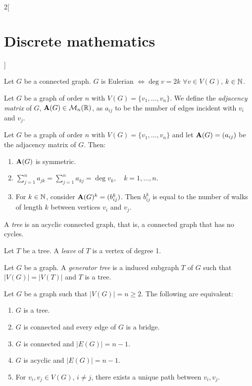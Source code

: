\documentclass[../../../main.tex]{subfiles}
\begin{document}
\begin{multicols}{2}[\section{Discrete mathematics}]
\begin{definition}
  \end{definition}
  \begin{theorem}
    Let $G$ be a connected graph. $G$ is Eulerian $\iff\deg v=2k$ $\forall v\in V(G)$, $k\in\mathbb{N} $.
  \end{theorem}
  \begin{definition}
    Let $G$ be a graph of order $n$ with $V(G)=\{v_1,\ldots,v_n\}$. We define the \emph{adjacency matrix} of $G$, $\boldsymbol{\mathrm{A}}(G)\in\mathcal{M}_n(\mathbb{R} )$, as $a_{ij}$ to be the number of edges incident with $v_i$ and $v_j$.
  \end{definition}
  \begin{prop}
    Let $G$ be a graph of order $n$ with $V(G)=\{v_1,\ldots,v_n\}$ and let $\boldsymbol{\mathrm{A}}(G)=(a_{ij})$ be the adjacency matrix of $G$. Then:
    \begin{enumerate}
      \item $\boldsymbol{\mathrm{A}}(G)$ is symmetric.
      \item $\displaystyle\sum_{j=1}^n a_{jk}=\sum_{j=1}^n a_{kj}=\deg v_k,\quad k=1,\ldots,n$.
      \item For $k\in\mathbb{N} $, consider $\boldsymbol{\mathrm{A}}(G)^k=(b_{ij}^k)$. Then $b_{ij}^k$ is equal to the number of walks of length $k$ between vertices $v_i$ and $v_j$.
    \end{enumerate}
  \end{prop}
  \begin{definition}
    A \emph{tree} is an acyclic connected graph, that is, a connected graph that has no cycles.
  \end{definition}
  \begin{definition}
    Let $T$ be a tree. A \emph{leave} of $T$ is a vertex of degree 1.
  \end{definition}
  \begin{definition}
    Let $G$ be a graph. A \emph{generator tree} is a induced subgraph $T$ of $G$ such that $|V(G)|=|V(T)|$ and $T$ is a tree.
  \end{definition}
  \begin{prop}
    Let $G$ be a graph such that $|V(G)|=n\geq 2$. The following are equivalent:
    \begin{enumerate}
      \item $G$ is a tree.
      \item $G$ is connected and every edge of $G$ is a bridge.
      \item $G$ is connected and $|E(G)|=n-1$.
      \item $G$ is acyclic and $|E(G)|=n-1$.
      \item For $v_i,v_j\in V(G)$, $i\ne j$, there exists a unique path between $v_i,v_j$.

\end{enumerate}
\end{prop}
\end{multicols}
\end{document}
